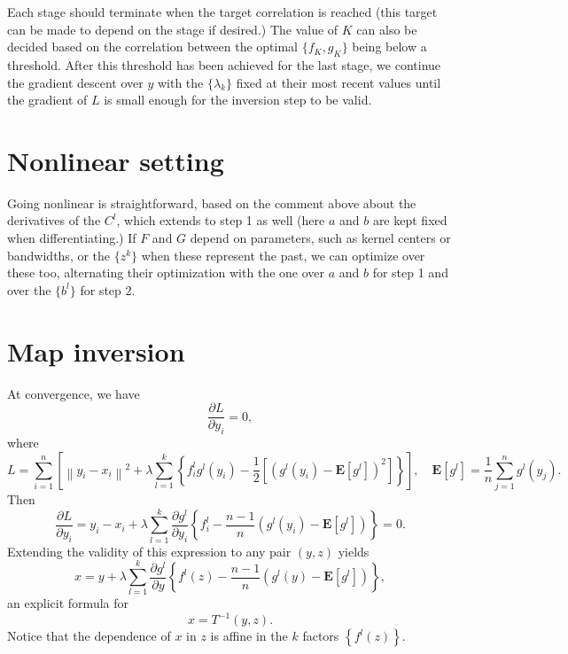 \documentclass[a4paper,11pt]{article}
\newcommand{\E}{\mathbf E}
\theoremstyle{definition}
\begin{document}
Each stage should terminate when the target correlation is reached (this target can be made to depend on the stage if desired.) The value of $K$ can also be decided based on the correlation between the optimal $\{f_K, g_K\}$ being below a threshold. After this threshold has been achieved for the last stage, we continue the gradient descent over $y$ with the $\{\lambda_k\}$ fixed at their most recent values until the gradient of $L$ is small enough for the inversion step to be valid.


\section{Nonlinear setting}


Going nonlinear is straightforward, based on the comment above about the derivatives of the $C^l$, which extends to step 1 as well (here $a$ and $b$ are kept fixed when differentiating.) If $F$ and $G$ depend on parameters, such as kernel centers or bandwidths, or the $\{z^k\}$ when these represent the past, we can optimize over these too, alternating their optimization with the one over $a$ and $b$ for step 1 and over the $\{b^l\}$ for step 2.


\section{Map inversion}


At convergence, we have
%
$$ \frac{\partial L}{\partial y_i} = 0, $$
%
where
%
$$ L = \sum_{i=1}^n \left[ \left\|y_i - x_i\right\|^2 + \lambda \sum_{l=1}^k \left\{f_i^l g^l\left(y_i\right) - \frac{1}{2} \left[\left(g^l\left(y_i\right) - \E[g^l]\right)^2 \right] \right\} \right] , \quad \E[g^l] = \frac{1}{n} \sum_{j=1}^n g^l\left(y_j\right) . $$
%
Then
%
$$ \frac{\partial L}{\partial y_i} = y_i - x_i + \lambda \sum_{l=1}^k \frac{\partial g^l}{\partial y_i} \left\{f_i^l - \frac{n-1}{n} \left(g^l\left(y_i\right) - \E[g^l]\right)  \right\} = 0. $$
%
Extending the validity of this expression to any pair $(y, z)$ yields
%
$$ x = y + \lambda \sum_{l=1}^k \frac{\partial g^l}{\partial y} \left\{f^l\left(z\right) - \frac{n-1}{n} \left(g^l\left(y\right) - \E[g^l]\right) \right\} ,$$
%
an explicit formula for
%
$$ x = T^{-1}\left(y, z\right). $$ 
%
Notice that the dependence of $x$ in $z$ is affine in the $k$ factors $\left\{f^l(z)\right\}$.
\end{document}
